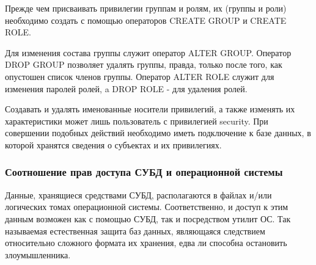 Прежде чем присваивать привилегии группам и ролям, их (группы и роли) необходимо создать с помощью операторов CREATE GROUP и CREATE ROLE.

Для изменения состава группы служит оператор ALTER GROUP. Оператор DROP GROUP позволяет удалять группы, правда, только после того, как опустошен список членов группы. Оператор ALTER ROLE служит для изменения паролей ролей, a DROP ROLE - для удаления ролей.

Создавать и удалять именованные носители привилегий, а также изменять их характеристики может лишь пользователь с привилегией security. При совершении подобных действий необходимо иметь подключение к базе данных, в которой хранятся сведения о субъектах и их привилегиях.
\subsubsection{Соотношение прав доступа СУБД и операционной системы}
Данные, хранящиеся средствами СУБД, располагаются в файлах и/или логических томах операционной системы. Соответственно, и доступ к этим данным возможен как с помощью СУБД, так и посредством утилит ОС. Так называемая естественная защита баз данных, являющаяся следствием относительно сложного формата их хранения, едва ли способна остановить злоумышленника.

